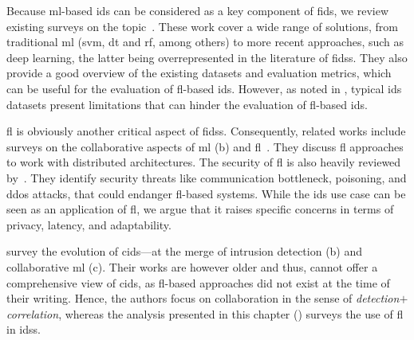 Because \gls{ml}-based \gls{ids} can be considered as a key component of \gls{fids}, we review existing surveys on the topic~\cite{buczak_SurveyDataMining_2016,meng_WhenIntrusionDetection_2018,chaabouni_NetworkIntrusionDetection_2019,dacosta_InternetThingssurvey_2019}.
These work cover a wide range of solutions, from traditional \gls{ml} (\gls{svm}, \gls{dt} and \gls{rf}, among others) to more recent approaches, such as deep learning, the latter being overrepresented in the literature of \glspl{fids}.
They also provide a good overview of the existing datasets and evaluation metrics, which can be useful for the evaluation of \gls{fl}-based \gls{ids}.
However, as noted in , typical \gls{ids} datasets present limitations that can hinder the evaluation of \gls{fl}-based \gls{ids}.

\Gls{fl} is obviously another critical aspect of \glspl{fids}.
Consequently, related works include surveys on the collaborative aspects of \gls{ml} (b) and \gls{fl}~\cite{aledhari_FederatedLearningSurvey_2020,lo_SystematicLiteratureReview_2021}.
They discuss \gls{fl} approaches to work with distributed architectures.
The security of \gls{fl} is also heavily reviewed by~\cite{shen_DistributedMachineLearning_2020,lyu_ThreatsFederatedLearning_2020,mothukuri_surveysecurityprivacy_2021}.
They identify security threats like communication bottleneck, poisoning, and \gls{ddos} attacks, that could endanger \gls{fl}-based systems.
While the \gls{ids} use case can be seen as an application of \gls{fl}, we argue that it raises specific concerns in terms of privacy, latency, and adaptability.

\textcite{zhou_surveycoordinatedattacks_2010,vasilomanolakis_TaxonomySurveyCollaborative_2015} survey the evolution of \gls{cids}---at the merge of intrusion
detection (b) and collaborative \gls{ml} (c).
Their works are however older and thus, cannot offer a comprehensive view of \gls{cids}, as \gls{fl}-based approaches did not exist at the time of their writing.
Hence, the authors focus on collaboration in the sense of \emph{detection}$+$\emph{correlation}, whereas the analysis presented in this chapter () surveys the use of \gls{fl} in \glspl{ids}.

